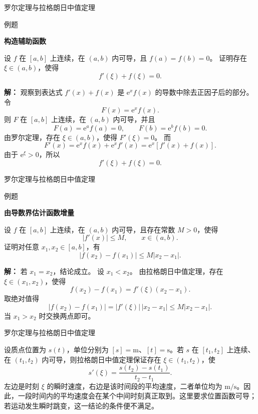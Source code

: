 \documentclass[aspectratio=169,10pt,fontset=fandol]{ctexbeamer}
\newcommand{\ee}{\mathrm{e}}
\begin{document}
\begin{frame}[t,fragile]{罗尔定理与拉格朗日中值定理}
\normalsize
\begin{block}{例题}
{\normalsize
\textbf{构造辅助函数}\par

设 $f$ 在 $[a,b]$ 上连续，在 $(a,b)$ 内可导，且 $f(a)=f(b)=0$。 证明存在 $\xi\in(a,b)$，使得
\[
f'(\xi)+f(\xi)=0.
\]

}
\end{block}
\pause
{\normalsize
\textbf{解：}
观察到表达式 $f'(x)+f(x)$ 是 $\ee^x f(x)$ 的导数中除去正因子后的部分。 令
\[
F(x)=\ee^x f(x).
\]
则 $F$ 在 $[a,b]$ 上连续，在 $(a,b)$ 内可导，并且
\[
F(a)=\ee^a f(a)=0,\qquad F(b)=\ee^b f(b)=0.
\]
由罗尔定理，存在 $\xi\in(a,b)$，使得 $F'(\xi)=0$。 而
\[
F'(x)=\ee^x f(x)+\ee^x f'(x)=\ee^x[f'(x)+f(x)].
\]
由于 $\ee^\xi>0$，所以
\[
f'(\xi)+f(\xi)=0.
\]

}
\end{frame}
\begin{frame}[t,fragile]{罗尔定理与拉格朗日中值定理}
\normalsize
\begin{block}{例题}
{\normalsize
\textbf{由导数界估计函数增量}\par

设 $f$ 在 $[a,b]$ 上连续，在 $(a,b)$ 内可导，且存在常数 $M>0$，使得
\[
|f'(x)|\leq M,\qquad x\in(a,b).
\]
证明对任意 $x_1,x_2\in[a,b]$，有
\[
|f(x_2)-f(x_1)|\leq M|x_2-x_1|.
\]

}
\end{block}
\pause
{\normalsize
\textbf{解：}
若 $x_1=x_2$，结论成立。 设 $x_1<x_2$。 由拉格朗日中值定理，存在 $\xi\in(x_1,x_2)$，使得
\[
f(x_2)-f(x_1)=f'(\xi)(x_2-x_1).
\]
取绝对值得
\[
|f(x_2)-f(x_1)|=|f'(\xi)|\,|x_2-x_1|\leq M|x_2-x_1|.
\]
当 $x_1>x_2$ 时交换两点即可。

}
\end{frame}
\begin{frame}[t,fragile]{罗尔定理与拉格朗日中值定理}
\normalsize
{\normalsize
\begin{application}[物理：平均速度与瞬时速度]
设质点位置为 $s(t)$，单位分别为 $[s]=\mathrm m$、$[t]=\mathrm s$。若 $s$ 在 $[t_1,t_2]$ 上连续、在 $(t_1,t_2)$ 内可导，则拉格朗日中值定理保证存在 $\xi\in(t_1,t_2)$，使
\[
s'(\xi)=\frac{s(t_2)-s(t_1)}{t_2-t_1}.
\]
左边是时刻 $\xi$ 的瞬时速度，右边是该时间段的平均速度，二者单位均为 $\mathrm{m/s}$。因此，一段时间内的平均速度会在某个中间时刻真正取到。这里要求位置函数可导；若运动发生瞬时跳变，这一结论的条件便不满足。
\end{application}
}
\end{frame}
\end{document}
